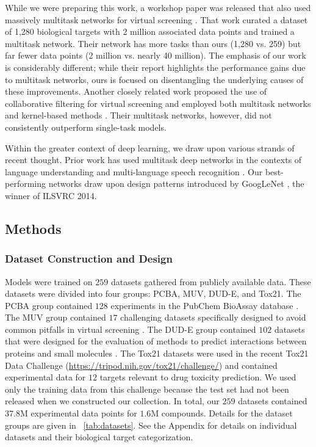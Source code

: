 While we were preparing this work, a workshop paper was released that also
used massively multitask networks for virtual screening
\cite{unterthinerdeep}. That work curated a dataset of 1,280 biological
targets with 2 million associated data points and trained a multitask
network. Their network has more tasks than ours (1,280 vs. 259) but far
fewer data points (2 million vs. nearly 40 million). The emphasis of our
work is considerably different; while their report highlights the
performance gains due to multitask networks, ours is focused on
disentangling the underlying causes of these improvements. Another closely
related work proposed the use of collaborative filtering for virtual
screening and employed both multitask networks and kernel-based methods
\cite{erhan2006collaborative}. Their multitask networks, however, did not
consistently outperform single-task models.

Within the greater context of deep learning, we draw upon various strands
of recent thought. Prior work has used multitask deep networks in the
contexts of language understanding \cite{collobert2008unified} and
multi-language speech recognition \cite{deng2013new}. Our best-performing
networks draw upon design patterns introduced by GoogLeNet
\cite{szegedy2014going}, the winner of ILSVRC 2014.

\subsection{Methods}

\subsubsection{Dataset Construction and Design}
\label{sec:datasets}
Models were trained on $259$ datasets gathered from publicly available
data.  These datasets were divided into four groups: PCBA, MUV, DUD-E, and
Tox21.  The PCBA group contained $128$ experiments in the PubChem BioAssay
database \cite{wang2012pubchem}.  The MUV group contained $17$ challenging
datasets specifically designed to avoid common pitfalls in virtual
screening \cite{rohrer2009maximum}. The DUD-E group contained $102$
datasets that were designed for the evaluation of methods to predict
interactions between proteins and small molecules
\cite{mysinger2012directory}.  The Tox21 datasets were used in the recent
Tox21 Data Challenge (\url{https://tripod.nih.gov/tox21/challenge/}) and
contained experimental data for $12$ targets relevant to drug toxicity
prediction. We used only the training data from this challenge because the
test set had not been released when we constructed our collection.  In
total, our $259$ datasets contained $37.8$M experimental data points for
$1.6$M compounds. Details for the dataset groups are given in
\tablename~\ref{tab:datasets}. See the Appendix for details on individual
datasets and their biological target categorization.

